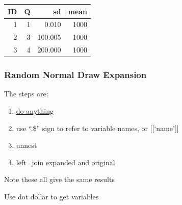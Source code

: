 \documentclass[
]{book}
\newenvironment{Shaded}{\begin{snugshade}}{\end{snugshade}}
\newcommand{\CommentTok}[1]{\textcolor[rgb]{0.56,0.35,0.01}{\textit{#1}}}
\newcommand{\DataTypeTok}[1]{\textcolor[rgb]{0.13,0.29,0.53}{#1}}
\newcommand{\KeywordTok}[1]{\textcolor[rgb]{0.13,0.29,0.53}{\textbf{#1}}}
\newcommand{\NormalTok}[1]{#1}
\newcommand{\OperatorTok}[1]{\textcolor[rgb]{0.81,0.36,0.00}{\textbf{#1}}}
\newcommand{\StringTok}[1]{\textcolor[rgb]{0.31,0.60,0.02}{#1}}
\providecommand{\tightlist}{%
  \setlength{\itemsep}{0pt}\setlength{\parskip}{0pt}}
\begin{document}
\begin{table}[!h]
\centering
\begin{tabular}{r|r|r|r}
\hline
ID & Q & sd & mean\\
\hline
\rowcolor{gray!6}  1 & 1 & 0.010 & 1000\\
\hline
2 & 3 & 100.005 & 1000\\
\hline
\rowcolor{gray!6}  3 & 4 & 200.000 & 1000\\
\hline
\end{tabular}
\end{table}

\hypertarget{random-normal-draw-expansion}{%
\subsubsection{Random Normal Draw Expansion}\label{random-normal-draw-expansion}}

The steps are:

\begin{enumerate}
\def\labelenumi{\arabic{enumi}.}
\tightlist
\item
  \href{https://dplyr.tidyverse.org/reference/do.html}{do anything}
\item
  use ``.\$'' sign to refer to variable names, or {[}{[}`name'{]}{]}
\item
  unnest
\item
  left\_join expanded and original
\end{enumerate}

Note these all give the same results

Use dot dollar to get variables

\begin{Shaded}
\end{Shaded}
\end{document}
